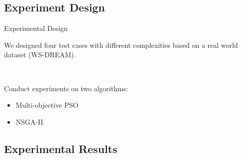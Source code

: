 \documentclass[10pt]{beamer}
\begin{document}
\subsection{Experiment Design}
\begin{frame}{Experimental Design}{}

	We designed four test cases with different complexities based on a real world dataset (WS-DREAM).
\begin{table}[h]
	{\centering
		\caption{Test Cases}
	\\}
\end{table}

Conduct experiments on two algorithms:
\begin{itemize}
	\item Multi-objective PSO
	\item NSGA-II
\end{itemize}

\end{frame}
\subsection{Experimental Results}
\end{document}
